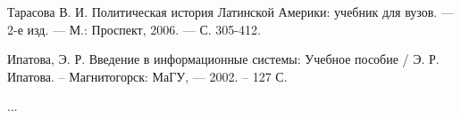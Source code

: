 \documentclass[../thesis.tex]{subfiles}
\begin{document}
{}

\begin{thebibliography}{00}

 Тарасова В. И. Политическая история Латинской Америки: учебник для вузов. — 2-е изд. — М.: Проспект, 2006. — С. 305-412.

 Ипатова, Э. Р. Введение в информационные системы: Учебное пособие / Э. Р. Ипатова. – Магнитогорск: МаГУ, — 2002. – 127 С.

 ...

\end{thebibliography}
\end{document}
